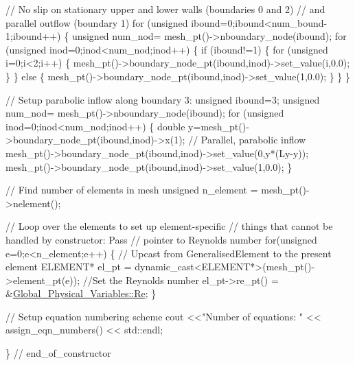 \begin{DoxyCodeInclude}

 
 \textcolor{comment}{// No slip on stationary upper and lower walls (boundaries 0 and 2) }
 \textcolor{comment}{// and parallel outflow (boundary 1) }
 \textcolor{keywordflow}{for} (\textcolor{keywordtype}{unsigned} ibound=0;ibound<num\_bound-1;ibound++)
  \{
   \textcolor{keywordtype}{unsigned} num\_nod= mesh\_pt()->nboundary\_node(ibound);
   \textcolor{keywordflow}{for} (\textcolor{keywordtype}{unsigned} inod=0;inod<num\_nod;inod++)
    \{
     \textcolor{keywordflow}{if} (ibound!=1)
      \{
       \textcolor{keywordflow}{for} (\textcolor{keywordtype}{unsigned} i=0;i<2;i++)
        \{
         mesh\_pt()->boundary\_node\_pt(ibound,inod)->set\_value(i,0.0);
        \}
      \}
     \textcolor{keywordflow}{else}
      \{
       mesh\_pt()->boundary\_node\_pt(ibound,inod)->set\_value(1,0.0);
      \}
    \}
  \}


 \textcolor{comment}{// Setup parabolic inflow along boundary 3:}
 \textcolor{keywordtype}{unsigned} ibound=3; 
 \textcolor{keywordtype}{unsigned} num\_nod= mesh\_pt()->nboundary\_node(ibound);
 \textcolor{keywordflow}{for} (\textcolor{keywordtype}{unsigned} inod=0;inod<num\_nod;inod++)
  \{
   \textcolor{keywordtype}{double} y=mesh\_pt()->boundary\_node\_pt(ibound,inod)->x(1);
   \textcolor{comment}{// Parallel, parabolic inflow}
   mesh\_pt()->boundary\_node\_pt(ibound,inod)->set\_value(0,y*(Ly-y));
   mesh\_pt()->boundary\_node\_pt(ibound,inod)->set\_value(1,0.0);
  \}

 \textcolor{comment}{// Find number of elements in mesh}
 \textcolor{keywordtype}{unsigned} n\_element = mesh\_pt()->nelement();

 \textcolor{comment}{// Loop over the elements to set up element-specific }
 \textcolor{comment}{// things that cannot be handled by constructor: Pass }
 \textcolor{comment}{// pointer to Reynolds number}
 \textcolor{keywordflow}{for}(\textcolor{keywordtype}{unsigned} e=0;e<n\_element;e++)
  \{
   \textcolor{comment}{// Upcast from GeneralisedElement to the present element}
   ELEMENT* el\_pt = \textcolor{keyword}{dynamic\_cast<}ELEMENT*\textcolor{keyword}{>}(mesh\_pt()->element\_pt(e));
   \textcolor{comment}{//Set the Reynolds number}
   el\_pt->re\_pt() = &\hyperlink{namespaceGlobal__Physical__Variables_ab814e627d2eb5bc50318879d19ab16b9}{Global\_Physical\_Variables::Re};
  \} 

 \textcolor{comment}{// Setup equation numbering scheme}
 cout <<\textcolor{stringliteral}{"Number of equations: "} << assign\_eqn\_numbers() << std::endl; 
 
\} \textcolor{comment}{// end\_of\_constructor}

\end{DoxyCodeInclude}




